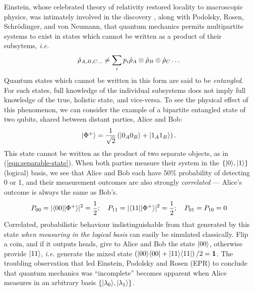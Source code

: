Einstein, whose celebrated theory of relativity restored locality to macroscopic physics, was intimately involved in the discovery \cite{Einstein1935}, along with Podolsky, Rosen, Schr\"odinger, and von Neumann, that quantum mechanics permits multipartite systems to exist in states which cannot be written as a product of their subsytems, \emph{i.e.}
\begin{equation}
\hat{\rho}_{A,B,C\ldots} \ne \sum_i p_i \hat{\rho}_A \otimes \hat{\rho}_B \otimes \hat{\rho}_C \ldots
\label{eqn:separable-state}
\end{equation}
Quantum states which cannot be written in this form are said to be \emph{entangled}. For such states, full knowledge of the individual subsystems does not imply full knowledge of the true, holistic state, and vice-versa. To see the physical effect of this phenomenon, we can consider the example of a bipartite entangled state of two qubits, shared between distant parties, Alice and Bob:
\begin{equation}
\mbox{$ | \Phi^+ \rangle $} = \frac{1}{\sqrt{2}} \left( \mbox{$ | 0_A 0_B \rangle $} + \mbox{$ | 1_A 1_B \rangle $} \right).
\end{equation}
 This state cannot be written as the product of two separate objects, as in (\ref{eqn:separable-state}). When both parties measure their system in the $\{ \mbox{$ | 0 \rangle $}, \mbox{$ | 1 \rangle $} \}$ (logical) basis, we see that Alice and Bob each have 50\% probability of detecting 0 or 1, and their measurement outcomes are also strongly \emph{correlated} --- Alice's outcome is always the same as Bob's.
\begin{equation}
P_{00} = |\mbox{$ \langle 00 | $} \mbox{$ | \Phi^+ \rangle $}|^2 = \frac{1}{2}; ~~~
P_{11} = |\mbox{$ \langle 11 | $} \mbox{$ | \Phi^+ \rangle $}|^2 = \frac{1}{2}; ~~~
P_{01}=P_{10} = 0
\end{equation}
Correlated, probabilistic behaviour indistinguishable from that generated by this state \emph{when measuring in the logical basis} can easily be simulated classically. Flip a coin, and if it outputs heads, give to Alice and Bob the state $\mbox{$ | 00 \rangle $}$, otherwise provide $\mbox{$ | 11 \rangle $}$, \emph{i.e.} generate the mixed state $\left(\mbox{$ | 00 \rangle $}\mbox{$ \langle 00 | $} +\mbox{$ | 11 \rangle $}\mbox{$ \langle 11 | $} \right)/2 = \mathbf{1}$. The troubling observation that led Einstein, Podolsky and Rosen (EPR) to conclude that quantum mechanics was ``incomplete'' becomes apparent when Alice measures in an arbitrary basis $\{ \mbox{$ | \lambda_0 \rangle $}, \mbox{$ | \lambda_1 \rangle $} \}$.  

